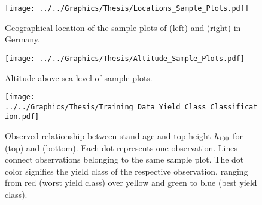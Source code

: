 \begin{figure}[H]
  \centering
  \texttt{[image: ../../Graphics/Thesis/Locations\_Sample\_Plots.pdf]}
  \caption{Geographical location of the sample plots of \Beech{} (left) and \Spruce{} (right) in Germany.}
  \label{fig:LocationsSamplePlots}
\end{figure}

\begin{figure}[H]
  \centering
  \texttt{[image: ../../Graphics/Thesis/Altitude\_Sample\_Plots.pdf]}
  \caption{Altitude above sea level of sample plots.}
  \label{fig:AltitudeSamplePlots}
\end{figure}

\newpage{}
\begin{figure}[H]
  \centering
  \texttt{[image: ../../Graphics/Thesis/Training\_Data\_Yield\_Class\_Classification.pdf]}
  \caption{Observed relationship between stand age and top height \(h_{100}\) for \Beech{} (top) and \Spruce{} (bottom).  Each dot represents one observation.  Lines connect observations belonging to the same sample plot.  The dot color signifies the yield class of the respective observation, ranging from red (worst yield class) over yellow and green to blue (best yield class).}
  \label{fig:TrainingDataYieldClassClassification}
\end{figure}


